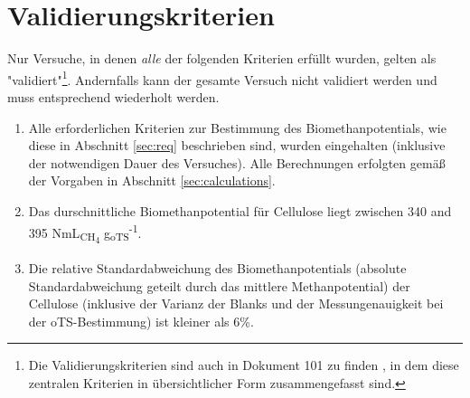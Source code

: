\documentclass[]{article}
\begin{document}
\section{Validierungskriterien}
\label{sec:crit}
Nur Versuche, in denen \textit{alle} der folgenden Kriterien erfüllt wurden, gelten als "validiert"\footnote{
Die Validierungskriterien sind auch in Dokument 101 zu finden \citep{BMPdoc101val}, in dem diese zentralen Kriterien in übersichtlicher Form zusammengefasst sind.
}.
Andernfalls kann der gesamte Versuch nicht validiert werden und muss entsprechend wiederholt werden.

\begin{enumerate}
  \item Alle erforderlichen Kriterien zur Bestimmung des Biomethanpotentials, wie diese in Abschnitt \ref{sec:req} beschrieben sind, wurden eingehalten (inklusive der notwendigen Dauer des Versuches). Alle Berechnungen erfolgten gemäß der Vorgaben in Abschnitt \ref{sec:calculations}.
  \item Das durschnittliche Biomethanpotential für Cellulose liegt zwischen 340 and 395 NmL\textsubscript{CH\textsubscript{4}} g\textsubscript{oTS}\textsuperscript{-1}.
  \item Die relative Standardabweichung des Biomethanpotentials (absolute Standardabweichung geteilt durch das mittlere Methanpotential) der Cellulose (inklusive der Varianz der Blanks und der Messungenauigkeit bei der oTS-Bestimmung) ist kleiner als 6\%.
\end{enumerate}


\end{document}

